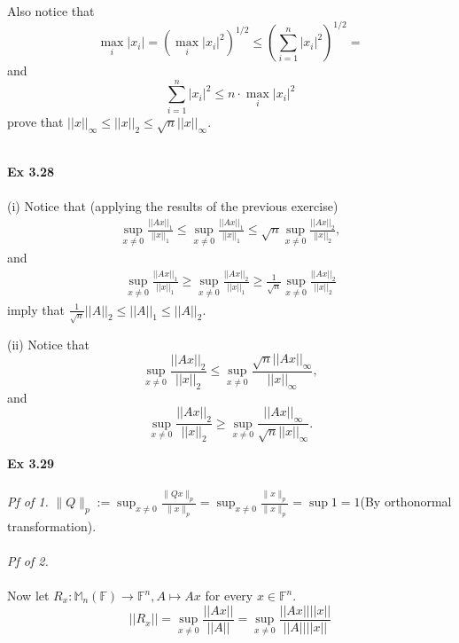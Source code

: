 \documentclass[letterpaper,12pt]{article}
\theoremstyle{definition}
\begin{document}
\begin{spacing}{1.3}{}
	Also notice that
	\begin{equation*}
	\max_{i}|x_i|=\left(\max_i|x_i|^2\right)^{1/2}\leq
	\left(\sum_{i=1}^n|x_i|^2\right)^{1/2}=
	\end{equation*}
	and
	\begin{equation*}
	\sum_{i=1}^n|x_i|^2\leq n\cdot\max_i|x_i|^2
	\end{equation*}
	prove that $||x||_\infty\leq||x||_2\leq \sqrt{n}||x||_\infty$. \\\\
	
	\setlength{\leftskip}{10pt}
	
	\textbf{Ex 3.28} \\\\
	(i)
	Notice that (applying the results of the previous exercise)
	\begin{align*}
	\sup_{x\neq 0}\frac{||Ax||_1}{||x||_1}\leq
	\sup_{x\neq 0}\frac{||Ax||_1}{||x||_1}\leq
	\sqrt{n}\sup_{x\neq 0}\frac{||Ax||_2}{||x||_2},
	\end{align*}
	and
	\begin{align*}
	\sup_{x\neq 0}\frac{||Ax||_1}{||x||_1}\geq
	\sup_{x\neq 0}\frac{||Ax||_2}{||x||_1}\geq
	\frac{1}{\sqrt{n}}\sup_{x\neq 0}\frac{||Ax||_2}{||x||_2}
	\end{align*}
	imply that $\frac{1}{\sqrt{n}}||A||_2\leq||A||_1\leq||A||_2$.
	
	(ii)
	Notice that
	\begin{equation*}
	\sup_{x\neq 0}\frac{||Ax||_2}{||x||_2}\leq
	\sup_{x\neq 0}\frac{\sqrt{n}||Ax||_\infty}{||x||_\infty},
	\end{equation*}
	and
	\begin{equation*}
	\sup_{x\neq 0}\frac{||Ax||_2}{||x||_2}\geq
	\sup_{x\neq 0}\frac{||Ax||_\infty}{\sqrt{n}||x||_\infty}.
	\end{equation*}
	
	
	\textbf{Ex 3.29} \\\\
	\emph{Pf of 1.} $\|Q\|_p := \sup_{x \neq 0} \frac{\|Qx\|_p}{\|x\|_p} = \sup_{x \neq 0} \frac{\|x\|_p}{\|x\|_p} = \sup 1 = 1 $(By orthonormal transformation). \\\\
	\emph{Pf of 2.} \\\\
	Now let $R_x:\mathbb M_n(\mathbb F)\to\mathbb F^n, A\mapsto Ax$ for every $x\in\mathbb F^n$.
	\begin{equation*}
	||R_x||=\sup_{x\neq 0}\frac{||Ax||}{||A||}=
	\sup_{x\neq 0}\frac{||Ax||||x||}{||A||||x||}
	\end{equation*}
	

\end{spacing}
\end{document}
